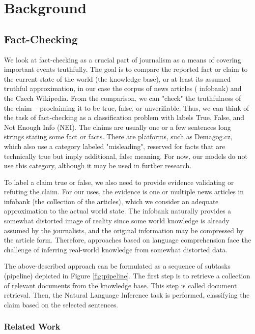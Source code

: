 \chapter{Background}

\section{Fact-Checking}

We look at fact-checking as a crucial part of journalism as a means of covering important events truthfully. 
The goal is to compare the reported fact or claim to the current state of the world (the knowledge base), or at least its assumed truthful approximation, in our case the corpus of \CTK{} news articles (\CTK{} infobank) and the Czech Wikipedia.
From the comparison, we can "check" the truthfulness of the claim -- proclaiming it to be true, false, or unverifiable. 
Thus, we can think of the task of fact-checking as a classification problem with labels True, False, and Not Enough Info (NEI). 
The claims are usually one or a few sentences long strings stating some fact or facts. 
There are platforms, such as Demagog.cz, which also use a category labeled "misleading", reserved for facts that are technically true but imply additional, false meaning.
For now, our models do not use this category, although it may be used in further research.

To label a claim true or false, we also need to provide evidence validating or refuting the claim.
For our uses, the evidence is one or multiple news articles in \CTK{} infobank (the collection of the articles), which we consider an adequate approximation to the actual world state.
The infobank naturally provides a somewhat distorted image of reality since some world knowledge is already assumed by the journalists, and the original information may be compressed by the article form. 
Therefore, approaches based on language comprehension face the challenge of inferring real-world knowledge from somewhat distorted data. 

The above-described approach can be formulated as a sequence of subtasks (pipeline) depicted in Figure \ref{fig:pipeline}. The first step is to retrieve a collection of relevant documents from the knowledge base. This step is called document retrieval. Then, the Natural Language Inference task is performed, classifying the claim based on the selected sentences.

\subsection{Related Work}

